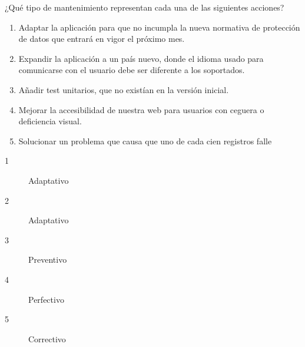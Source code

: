 

\begin{enunciado}
    ¿Qué tipo de mantenimiento representan cada una de las siguientes acciones?
    \begin{enumerate}
        \item Adaptar la aplicación para que no incumpla la nueva normativa de protección de datos que entrará en vigor el próximo mes.
        \item Expandir la aplicación a un país nuevo, donde el idioma usado para comunicarse con el usuario debe ser diferente a los soportados.
        \item Añadir test unitarios, que no existían en la versión inicial.
        \item Mejorar la accesibilidad de nuestra web para usuarios con ceguera o deficiencia visual.
        \item Solucionar un problema que causa que uno de cada cien registros falle
    \end{enumerate}
\end{enunciado}
\begin{solucion}
    \begin{description}
        \item[1] Adaptativo
        \item[2] Adaptativo
        \item[3] Preventivo
        \item[4] Perfectivo
        \item[5] Correctivo
    \end{description}
\end{solucion}